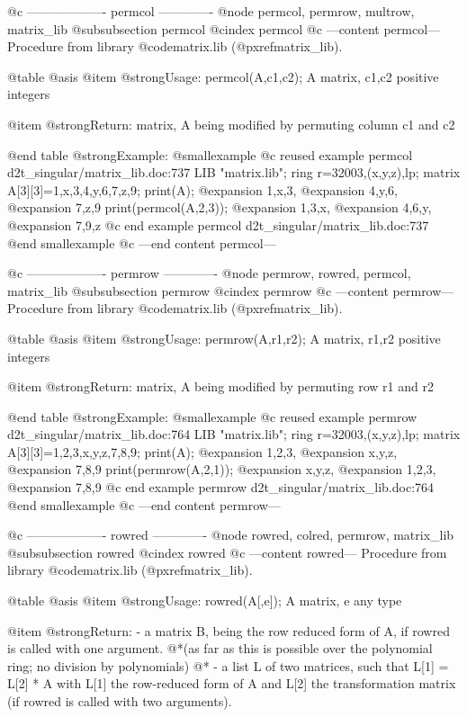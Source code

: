 @c ------------------- permcol -------------
@node permcol, permrow, multrow, matrix_lib
@subsubsection permcol
@cindex permcol
@c ---content permcol---
Procedure from library @code{matrix.lib} (@pxref{matrix_lib}).

@table @asis
@item @strong{Usage:}
permcol(A,c1,c2); A matrix, c1,c2 positive integers

@item @strong{Return:}
matrix, A being modified by permuting column c1 and c2

@end table
@strong{Example:}
@smallexample
@c reused example permcol d2t_singular/matrix_lib.doc:737 
LIB "matrix.lib";
ring r=32003,(x,y,z),lp;
matrix A[3][3]=1,x,3,4,y,6,7,z,9;
print(A);
@expansion{} 1,x,3,
@expansion{} 4,y,6,
@expansion{} 7,z,9 
print(permcol(A,2,3));
@expansion{} 1,3,x,
@expansion{} 4,6,y,
@expansion{} 7,9,z 
@c end example permcol d2t_singular/matrix_lib.doc:737
@end smallexample
@c ---end content permcol---

@c ------------------- permrow -------------
@node permrow, rowred, permcol, matrix_lib
@subsubsection permrow
@cindex permrow
@c ---content permrow---
Procedure from library @code{matrix.lib} (@pxref{matrix_lib}).

@table @asis
@item @strong{Usage:}
permrow(A,r1,r2); A matrix, r1,r2 positive integers

@item @strong{Return:}
matrix, A being modified by permuting row r1 and r2

@end table
@strong{Example:}
@smallexample
@c reused example permrow d2t_singular/matrix_lib.doc:764 
LIB "matrix.lib";
ring r=32003,(x,y,z),lp;
matrix A[3][3]=1,2,3,x,y,z,7,8,9;
print(A);
@expansion{} 1,2,3,
@expansion{} x,y,z,
@expansion{} 7,8,9 
print(permrow(A,2,1));
@expansion{} x,y,z,
@expansion{} 1,2,3,
@expansion{} 7,8,9 
@c end example permrow d2t_singular/matrix_lib.doc:764
@end smallexample
@c ---end content permrow---

@c ------------------- rowred -------------
@node rowred, colred, permrow, matrix_lib
@subsubsection rowred
@cindex rowred
@c ---content rowred---
Procedure from library @code{matrix.lib} (@pxref{matrix_lib}).

@table @asis
@item @strong{Usage:}
rowred(A[,e]); A matrix, e any type

@item @strong{Return:}
- a matrix B, being the row reduced form of A, if rowred is called
with one argument.
@*(as far as this is possible over the polynomial ring; no division
by polynomials)
@* - a list L of two matrices, such that L[1] = L[2] * A with L[1]
the row-reduced form of A and L[2] the transformation matrix
(if rowred is called with two arguments).

